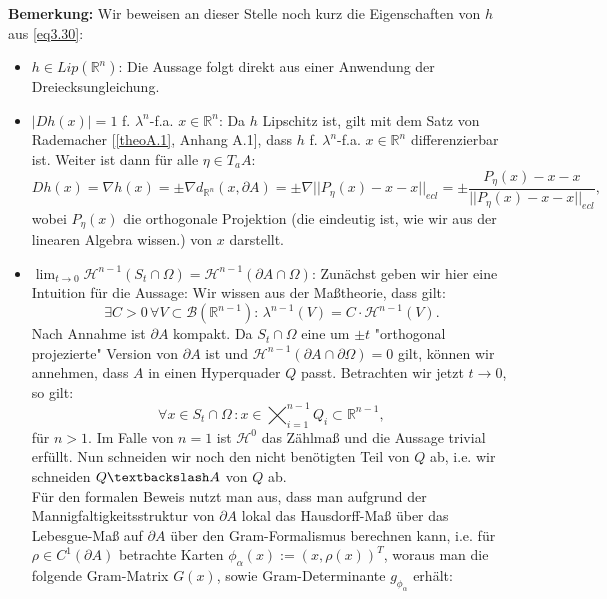 \textbf{Bemerkung:} Wir beweisen an dieser Stelle noch kurz die Eigenschaften von \(h\) aus \eqref{eq3.30}:
\begin{itemize}
    \item \(h \in Lip(\mathbb{R}^n)\): Die Aussage folgt direkt aus einer Anwendung der Dreiecksungleichung.
    \item \(|Dh(x)| = 1 \) f. \(\lambda^n\)-f.a. \(x \in \mathbb{R}^n\): Da \(h\) Lipschitz ist, gilt mit dem Satz von Rademacher [\ref{theoA.1}, Anhang A.1], dass \(h\) f. \(\lambda^n\)-f.a. \(x \in \mathbb{R}^n\) differenzierbar ist. Weiter ist dann für alle \(\eta \in T_a A\):
    \begin{equation}
        Dh(x) = \nabla h(x) = \pm \nabla d_{\mathbb{R}^n}(x,\partial A) = \pm \nabla ||P_{\eta}(x) - x - x||_{ecl} = \pm \frac{P_{\eta}(x) - x - x}{||P_{\eta}(x) - x - x||_{ecl}},
    \end{equation}
    wobei \(P_{\eta} (x)\) die orthogonale Projektion (die eindeutig ist, wie wir aus der linearen Algebra wissen.) von \(x\) darstellt.
    \item \(\lim_{t \to 0} \mathcal{H}^{n-1} (S_t \cap \Omega) = \mathcal{H}^{n-1}(\partial A \cap \Omega)\): Zunächst geben wir hier eine Intuition für die Aussage: Wir wissen aus der Maßtheorie, dass gilt:
    \begin{equation}
        \exists C > 0 \, \forall V \subset \mathcal{B}(\mathbb{R}^{n-1}): \, \lambda^{n-1}(V) = C \cdot \mathcal{H}^{n-1}(V).
    \end{equation}
    Nach Annahme ist \(\partial A\) kompakt. Da \(S_t \cap \Omega\) eine um  \(\pm t\) "orthogonal projezierte" Version von \(\partial A\) ist und \(\mathcal{H}^{n-1}(\partial A \cap \partial \Omega) = 0\) gilt, können wir annehmen, dass \(A\) in einen Hyperquader \(Q\) passt. Betrachten wir jetzt \(t \to 0\), so gilt:
    \begin{equation}
        \forall x \in S_t \cap \Omega \, : x \in \bigtimes_{i=1}^{n-1} Q_i \subset \mathbb{R}^{n-1},
    \end{equation}
    für \(n>1\). Im Falle von \(n=1\) ist \(\mathcal{H}^0\) das Zählmaß und die Aussage trivial erfüllt. Nun schneiden wir noch den nicht benötigten Teil von \(Q\) ab, i.e. wir schneiden \(Q \textbackslash A\) von \(Q\) ab.\\
    Für den formalen Beweis nutzt man aus, dass man aufgrund der Mannigfaltigkeitsstruktur von \(\partial A\) lokal das Hausdorff-Maß über das Lebesgue-Maß auf \(\partial A\) über den Gram-Formalismus berechnen kann, i.e. für \(\rho \in C^1(\partial A)\) betrachte Karten \(\phi_{\alpha}(x):=(x,\rho(x))^T\), woraus man die folgende Gram-Matrix \(G(x)\), sowie Gram-Determinante \(g_{\phi_{\alpha}}\) erhält:

\end{itemize}
